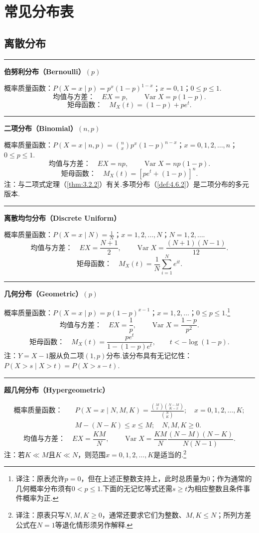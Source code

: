 \clearpage\section*{常见分布表}\label{app:distributions}
\begingroup
\newcommand{\distheading}[1]{\par\medskip\needspace{10\baselineskip}\noindent\rule{\linewidth}{.3pt}\par\smallskip\noindent\textbf{#1}\par\smallskip}
\subsection*{离散分布}
\distheading{伯努利分布（Bernoulli）$(p)$}
概率质量函数：$P(X=x\mid p)=p^x(1-p)^{1-x}$；$x=0,1$；$0\le p\le1$.
$$\text{均值与方差：}\quad EX=p,\qquad\operatorname{Var}X=p(1-p).$$
$$\text{矩母函数：}\quad M_X(t)=(1-p)+pe^t.$$

\distheading{二项分布（Binomial）$(n,p)$}
概率质量函数：$P(X=x\mid n,p)=\binom nx p^x(1-p)^{n-x}$；$x=0,1,2,\ldots,n$；$0\le p\le1$.
$$\text{均值与方差：}\quad EX=np,\qquad\operatorname{Var}X=np(1-p).$$
$$\text{矩母函数：}\quad M_X(t)=[pe^t+(1-p)]^n.$$
注：与二项式定理（\autoref{thm:3.2.2}）有关.多项分布（\autoref{def:4.6.2}）是二项分布的多元版本.

\distheading{离散均匀分布（Discrete Uniform）}
概率质量函数：$P(X=x\mid N)=\frac1N$；$x=1,2,\ldots,N$；$N=1,2,\ldots$.
$$\text{均值与方差：}\quad EX=\frac{N+1}{2},\qquad\operatorname{Var}X=\frac{(N+1)(N-1)}{12}.$$
$$\text{矩母函数：}\quad M_X(t)=\frac1N\sum_{i=1}^N e^{it}.$$

\distheading{几何分布（Geometric）$(p)$}
概率质量函数：$P(X=x\mid p)=p(1-p)^{x-1}$；$x=1,2,\ldots$；$0\le p\le1$.\footnote{译注：原表允许$p=0$，但在上述正整数支持上，此时总质量为0；作为通常的几何概率分布须有$0<p\le1$.下面的无记忆等式还需$s\ge t$为相应整数且条件事件概率为正.}
$$\text{均值与方差：}\quad EX=\frac1p,\qquad\operatorname{Var}X=\frac{1-p}{p^2}.$$
$$\text{矩母函数：}\quad M_X(t)=\frac{pe^t}{1-(1-p)e^t},\qquad t<-\log(1-p).$$
注：$Y=X-1$服从负二项$(1,p)$分布.该分布具有无记忆性：$P(X>s\mid X>t)=P(X>s-t)$.

\distheading{超几何分布（Hypergeometric）}
\begin{equation*}\begin{aligned}
\text{概率质量函数：}\quad&P(X=x\mid N,M,K)=\frac{\binom Mx\binom{N-M}{K-x}}{\binom NK};\quad x=0,1,2,\ldots,K;\\
&M-(N-K)\le x\le M;\quad N,M,K\ge0.
\end{aligned}\end{equation*}
$$\text{均值与方差：}\quad EX=\frac{KM}{N},\qquad\operatorname{Var}X=\frac{KM}{N}\frac{(N-M)(N-K)}{N(N-1)}.$$
注：若$K\ll M$且$K\ll N$，则范围$x=0,1,2,\ldots,K$是适当的.\footnote{译注：原表只写$N,M,K\ge0$，通常还要求它们为整数、$M,K\le N$；所列方差公式在$N=1$等退化情形须另作解释.}


